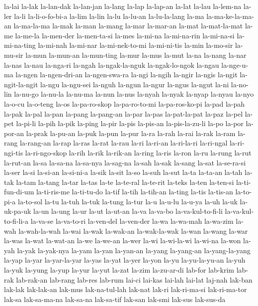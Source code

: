 {la-lai la-lak la-lan-dak la-lan-jan la-lang la-lap la-lap-an la-lat la-lau
la-lem-na la-ler la-li la-li-o-fo-bi-a la-lim la-lin la-lu la-lu-an
la-lu-la-lang la-ma la-ma-ke-la-ma-an la-ma-la-ma la-mak la-man la-mang
la-mar la-mar-an la-mat la-mat-la-mat la-me la-me-la la-men-der
la-men-ta-si la-mes la-mi-na la-mi-na-rin la-mi-na-si la-mi-na-ting
la-mi-nah la-mi-nar la-mi-nek-to-mi la-mi-ni-tis la-min la-mo-sir
la-mu-sir la-mun la-mun-an la-mun-ting la-mur la-mus la-mut la-na la-nang
la-nar la-nas la-nau la-nga-ri la-ngah la-ngak-la-nguk la-ngak-lo-ngok
la-ngau la-nge-u-ma la-ngen la-ngen-dri-an la-ngen-swa-ra la-ngi la-ngih
la-ngir la-ngis la-ngit la-ngit-la-ngit la-ngu la-ngu-sei la-nguh la-ngun
la-ngur la-ngus la-ngut la-ni la-no-lin la-nu-go la-nu-la la-nu-ma la-nun
la-nus la-nyah la-nyak la-nyap la-nyau la-nyo la-o-cu la-o-teng la-os
la-pa-ro-skop la-pa-ro-to-mi la-pa-ros-ko-pi la-pad la-pah la-pak la-pal
la-pan la-pang la-pang-an la-par la-pas la-pat-la-pat la-paz la-pel la-pet
la-pi-li la-pih la-pik la-ping la-pir la-pis la-pis-an la-pis-la-zu-li
la-po la-por la-por-an la-prak la-pu-an la-puk la-pun la-pur la-ra la-rah
la-rai la-rak la-ram la-rang la-rang-an la-rap la-ras la-rat la-rau la-ri
la-ri-an la-ri-la-ri la-ri-ngal la-ri-ngi-tis la-ri-ngo-skop la-rih la-rik
la-rik-an la-ring la-ris la-ron la-ru la-rung la-rut la-rut-an la-sa
la-sa-na la-sa-nya la-sag-na la-sah la-sak la-sang la-sat la-se-ra-si
la-ser la-si la-si-an la-si-ni-a la-sik la-sit la-so la-suh la-sut la-ta
la-ta-an la-tah la-tak la-tam la-tang la-tar la-tas la-te la-te-ral
la-te-rit la-teks la-ten la-ten-si la-ti-fun-di-um la-ti-ris-me
la-ti-tu-do la-tif la-tih la-tih-an la-ting la-tis la-tis-an la-to-pi-a
la-to-sol la-tu la-tuh la-tuk la-tung la-tur la-u la-u-lu la-u-ya la-uh
la-uk la-uk-pa-uk la-un la-ung la-ur la-ut la-ut-an la-va la-va-bo
la-va-kul-to-fi-li la-va-kul-to-fi-li-a la-va-se la-va-to-ri la-ven-del
la-ven-der la-wa la-wa-mah la-wa-zim la-wah la-wah-la-wah la-wai la-wak
la-wak-an la-wak-la-wak la-wan la-wang la-war la-was la-wat la-wat-an
la-we la-we-an la-wer la-wi la-wi-la-wi la-wi-na la-won la-yah la-yak
la-yak-nya la-yam la-yan la-yan-an la-yang la-yang-an la-yang-la-yang
la-yap la-yar la-yar-la-yar la-yas la-yat la-yer la-yon la-yu
la-yu-la-yu-an la-yuh la-yuk la-yung la-yup la-yur la-yut la-zat la-zim
la-zu-ar-di lab-for lab-krim lab-rak lab-rak-an lab-rang lab-res lab-rum
lai-ci lai-kas lai-lah lai-lat laj-nah lak-ban lak-lak lak-lak-an lak-mus
lak-na-tul-lah lak-nat lak-ri lak-ri-ma-si lak-ri-ma-tor lak-sa
lak-sa-ma-na lak-sa-na lak-sa-tif lak-san lak-smi lak-sus lak-sus-da
}
